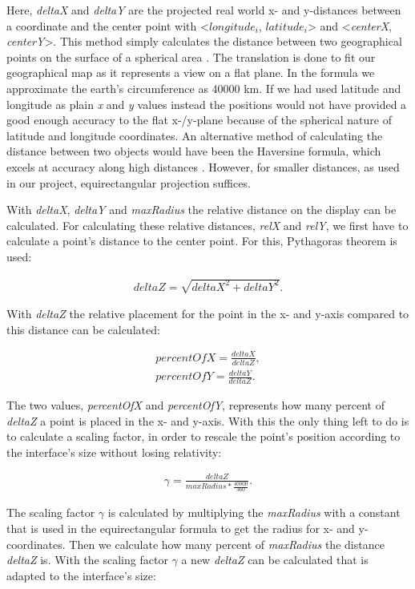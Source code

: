 Here, \textit{deltaX} and \textit{deltaY} are the projected real world x- and y-distances between a coordinate and the center point with <$longitude_i$, $latitude_i$> and <\textit{centerX}, \textit{centerY}>. This method simply calculates the distance between two geographical points on the surface of a spherical area \cite{equi}. The translation is done to fit our geographical map as it represents a view on a flat plane. In the formula we approximate the earth's circumference as 40000 km. If we had used latitude and longitude as plain \textit{x} and \textit{y} values instead the positions would not have provided a good enough accuracy to the flat x-/y-plane because of the spherical nature of latitude and longitude coordinates. An alternative method of calculating the distance between two objects would have been the Haversine formula, which excels at accuracy along high distances \cite{haversine}. However, for smaller distances, as used in our project, equirectangular projection suffices.

With \textit{deltaX}, \textit{deltaY} and \textit{maxRadius} the relative distance on the display can be calculated. For calculating these relative distances, \textit{relX} and \textit{relY}, 
we first have to calculate a point's distance to the center point. For this, Pythagoras theorem is used:

\begin{align*}
deltaZ = \sqrt{deltaX^2 + deltaY^2}.
\end{align*}

With \textit{deltaZ} the relative placement for the point in the x- and y-axis compared to this distance can be calculated:

\begin{align}
\label{eq:percent}
percentOfX = \frac{deltaX}{deltaZ}, \\
percentOfY = \frac{deltaY}{deltaZ}. \nonumber
\end{align}

The two values,  \textit{percentOfX} and \textit{percentOfY},  represents how many percent of \textit{deltaZ} a point is placed in the x- and y-axis. With this the only thing left to do is to calculate a scaling factor, in order to rescale the point's position according to the interface's size without losing relativity: 

\begin{align*}
\gamma = \frac{deltaZ}{maxRadius*\frac{40000}{360}}.
\end{align*}

The scaling factor \textit{$\gamma$} is calculated by multiplying the \textit{maxRadius} with a constant that is used in the equirectangular formula to get the radius for x- and y-coordinates. Then we calculate how many percent of \textit{maxRadius} the distance \textit{deltaZ} is. With the scaling factor \textit{$\gamma$} a new \textit{deltaZ} can be calculated that is adapted to the interface's size:

